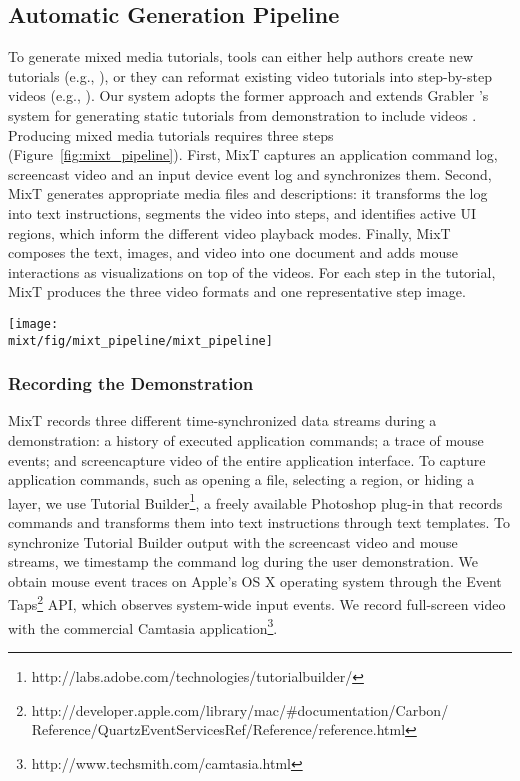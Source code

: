\subsection{Automatic Generation Pipeline}

To generate mixed media tutorials, tools can either help authors create new tutorials (e.g., \cite{Grabler:2009jj}), or they can reformat existing video tutorials into step-by-step videos (e.g., \cite{Pongnumkul:2011ju}). Our system adopts the former approach and extends Grabler \ea's system for generating static tutorials from demonstration to include videos \cite{Grabler:2009jj}. Producing mixed media tutorials requires three steps (Figure~\ref{fig:mixt_pipeline}). First, MixT captures an application command log, screencast video and an input device event log and synchronizes them. Second, MixT generates appropriate media files and descriptions: it transforms the log into text instructions, segments the video into steps, and identifies active UI regions, which inform the different video playback modes. Finally, MixT composes the text, images, and video into one document and adds mouse interactions as visualizations on top of the videos. For each step in the tutorial, MixT produces the three video formats and one representative step image.

\begin{figure*}[t]
  \centering
  \texttt{[image: \\mixt/fig/mixt\_pipeline/mixt\_pipeline]}
  \caption{MixT generates tutorials from video and log files.}
  \label{fig:mixt_pipeline}
\end{figure*}

\subsubsection{Recording the Demonstration}
MixT records three different time-synchronized data streams during a demonstration: a history of executed application commands; a trace of mouse events; and screencapture video of the entire application interface. To capture application commands, such as opening a file, selecting a region, or hiding a layer, we use Tutorial Builder\footnote{http://labs.adobe.com/technologies/tutorialbuilder/}, a freely available Photoshop plug-in that records commands and transforms them into text instructions through text templates. To synchronize Tutorial Builder output with the screencast video and mouse streams, we timestamp the command log during the user demonstration. We obtain mouse event traces on Apple’s OS X operating system through the Event Taps\footnote{http://developer.apple.com/library/mac/\#documentation/Carbon/\newline
Reference/QuartzEventServicesRef/Reference/reference.html} API, which observes system-wide input events. We record full-screen video with the commercial Camtasia application\footnote{http://www.techsmith.com/camtasia.html}.

